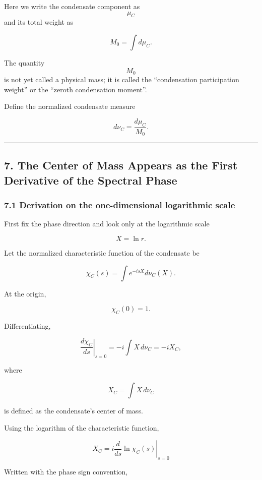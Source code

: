 \documentclass[
  a4paper,
]{article}
\begin{document}
Here we write the condensate component as \[\mu_C\] and its total weight
as

\[
M_0
=
\int d\mu_C.
\tag{13}
\]

The quantity \[M_0\] is not yet called a physical mass; it is called the
``condensation participation weight'' or the ``zeroth condensation
moment''.

Define the normalized condensate measure

\[
d\nu_C
=
\frac{d\mu_C}{M_0}.
\tag{14}
\]

\begin{center}\rule{0.5\linewidth}{0.5pt}\end{center}

\subsection{7. The Center of Mass Appears as the First Derivative of the
Spectral
Phase}\label{the-center-of-mass-appears-as-the-first-derivative-of-the-spectral-phase}

\subsubsection{7.1 Derivation on the one-dimensional logarithmic
scale}\label{derivation-on-the-one-dimensional-logarithmic-scale}

First fix the phase direction and look only at the logarithmic scale

\[
X=\ln r.
\]

Let the normalized characteristic function of the condensate be

\[
\chi_C(s)
=
\int
 e^{-isX}
d\nu_C(X).
\tag{15}
\]

At the origin,

\[
\chi_C(0)=1.
\]

Differentiating,

\[
\left.
\frac{d\chi_C}{ds}
\right|_{s=0}
=
-i
\int X\,d\nu_C
=
-iX_C,
\tag{16}
\]

where

\[
\boxed{
X_C
=
\int X\,d\nu_C
}
\tag{17}
\]

is defined as the condensate's center of mass.

Using the logarithm of the characteristic function,

\[
\boxed{
X_C
=
i
\left.
\frac{d}{ds}
\ln\chi_C(s)
\right|_{s=0}
}
\tag{18}
\]

Written with the phase sign convention,
\end{document}
